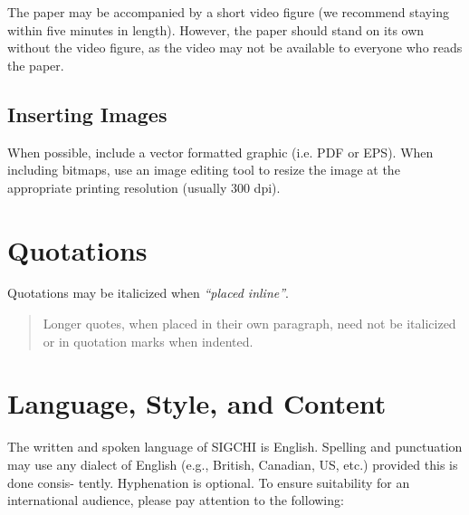 \documentclass{sigchi}
\begin{document}
The paper may be accompanied by a short video figure (we recommend staying within five
minutes in length). However, the paper should stand on its own without
the video figure, as the video may not be available to everyone who
reads the paper.  

\subsection{Inserting Images}
When possible, include a vector formatted graphic (i.e. PDF or EPS).
When including bitmaps,  use an image editing tool to resize the image
at the appropriate printing resolution (usually 300 dpi).

\section{Quotations}
Quotations may be italicized when \textit{``placed inline''}.

\begin{quote}
Longer quotes, when placed in their own paragraph, need not be
italicized or in quotation marks when indented.  
\end{quote}

\section{Language, Style, and Content}

The written and spoken language of SIGCHI is English. Spelling and
punctuation may use any dialect of English (e.g., British, Canadian,
US, etc.) provided this is done consis- tently. Hyphenation is
optional. To ensure suitability for an international audience, please
pay attention to the following:
\end{document}
